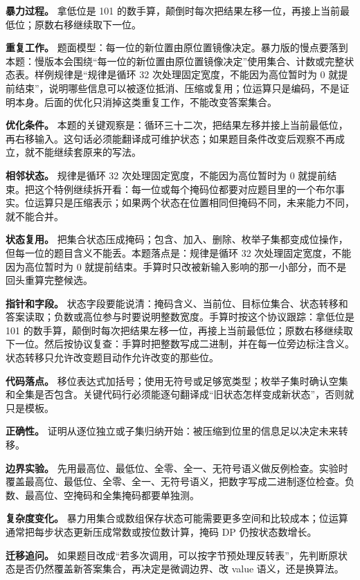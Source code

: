 \textbf{暴力过程。} 拿低位是 101 的数手算，颠倒时每次把结果左移一位，再接上当前最低位；原数右移继续取下一位。

\textbf{重复工作。} 题面模型：每一位的新位置由原位置镜像决定。暴力版的慢点要落到本题：慢版本会围绕“每一位的新位置由原位置镜像决定”使用集合、计数或完整状态表。样例规律是“规律是循环 32 次处理固定宽度，不能因为高位暂时为 0 就提前结束”，说明哪些信息可以被逐位抵消、压缩或复用；位运算只是编码，不是证明本身。后面的优化只消掉这类重复工作，不能改变答案集合。

\textbf{优化条件。} 本题的关键观察是：循环三十二次，把结果左移并接上当前最低位，再右移输入。这句话必须能翻译成可维护状态；如果题目条件改变后观察不再成立，就不能继续套原来的写法。

\textbf{相邻状态。} 规律是循环 32 次处理固定宽度，不能因为高位暂时为 0 就提前结束。把这个特例继续拆开看：每一位或每个掩码位都要对应题目里的一个布尔事实。位运算只是压缩表示；如果两个状态在位置相同但掩码不同，未来能力不同，就不能合并。

\textbf{状态复用。} 把集合状态压成掩码；包含、加入、删除、枚举子集都变成位操作，但每一位的题目含义不能丢。本题落点是：规律是循环 32 次处理固定宽度，不能因为高位暂时为 0 就提前结束。手算时只改被新输入影响的那一小部分，而不是回头重算完整候选。

\textbf{指针和字段。} 状态字段要能说清：掩码含义、当前位、目标位集合、状态转移和答案读取；负数或高位参与时要说明整数宽度。手算时按这个协议跟踪：拿低位是 101 的数手算，颠倒时每次把结果左移一位，再接上当前最低位；原数右移继续取下一位。然后按协议复查：手算时把整数写成二进制，并在每一位旁边标注含义。状态转移只允许改变题目动作允许改变的那些位。

\textbf{代码落点。} 移位表达式加括号；使用无符号或足够宽类型；枚举子集时确认空集和全集是否包含。关键代码行必须能逐句翻译成“旧状态怎样变成新状态”，否则就只是模板。

\textbf{正确性。} 证明从逐位独立或子集归纳开始：被压缩到位里的信息足以决定未来转移。

\textbf{边界实验。} 先用最高位、最低位、全零、全一、无符号语义做反例检查。实验时覆盖最高位、最低位、全零、全一、无符号语义，把数字写成二进制逐位检查。负数、最高位、空掩码和全集掩码都要单独测。

\textbf{复杂度变化。} 暴力用集合或数组保存状态可能需要更多空间和比较成本；位运算通常把每步状态更新压成常数或按位数计算，掩码 DP 仍按状态数增长。

\textbf{迁移追问。} 如果题目改成“若多次调用，可以按字节预处理反转表”，先判断原状态是否仍然覆盖新答案集合，再决定是微调边界、改 value 语义，还是换算法。

